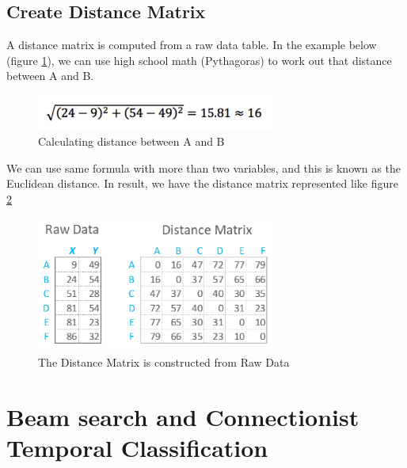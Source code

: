 
\subsection{Create Distance Matrix}
A distance matrix is computed from a raw data table. In the example below (figure \ref{fig:Chap3-DM_Formula}), we can use high school math (Pythagoras) to work out
that distance between A and B.

\begin{figure}[H]
	\centering
	\includegraphics[width=0.7\textwidth]{img/Chap3/DM_Formula}
	\caption{ Calculating distance between A and B}
	\label{fig:Chap3-DM_Formula}
\end{figure}

We can use same formula with more than two variables, and this is known as
the Euclidean distance.
In result, we have the distance matrix represented like figure \ref{fig:Chap3-DM-Raw}
\begin{figure}[H]
	\centering
	\includegraphics[width=0.7\textwidth]{img/Chap3/DM-Raw}
	\caption{ The Distance Matrix is constructed from Raw Data }
	\label{fig:Chap3-DM-Raw}
\end{figure}

\section{Beam search and Connectionist Temporal Classification}
